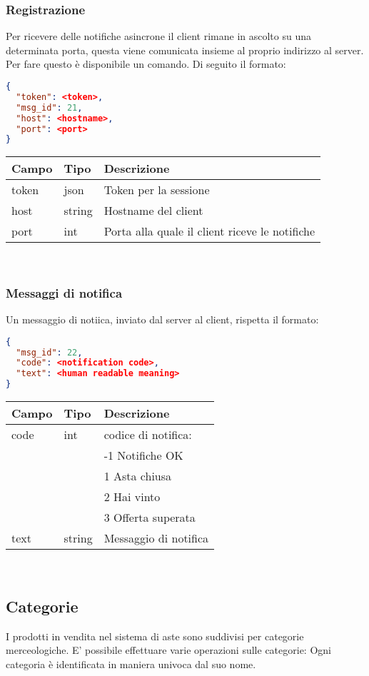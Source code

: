 \subsubsection{Registrazione}
Per ricevere delle notifiche asincrone il client  rimane in ascolto su una determinata porta, questa viene  comunicata insieme al proprio indirizzo  al server. Per fare questo è disponibile un comando. Di seguito il formato:\\
\begin{lstlisting}[language=json]
{
  "token": <token>,
  "msg_id": 21,
  "host": <hostname>,
  "port": <port>
}
\end{lstlisting}

\begin{tabular}{|l | l | l |}
\hline
Campo & Tipo & Descrizione \\ \hline
token & json & Token per la sessione \\ \hline
host & string & Hostname del client  \\ \hline
port & int & Porta alla quale il client riceve le notifiche  \\ \hline
\end{tabular} \\
\subsubsection{Messaggi di notifica}
Un messaggio di notiica, inviato dal server al client, rispetta il formato:
\begin{lstlisting}[language=json]
{
  "msg_id": 22,
  "code": <notification code>,
  "text": <human readable meaning>
}
\end{lstlisting}
\begin{tabular}{|l | l | l |}
\hline
Campo & Tipo & Descrizione \\ \hline
code & int & codice di notifica: \\
& & -1 Notifiche OK \\
& & 1 Asta chiusa\\
& & 2 Hai vinto\\
& & 3 Offerta superata\\ \hline

text & string & Messaggio di notifica \\ \hline
\end{tabular} \\


\subsection{Categorie}
I prodotti in vendita nel sistema di aste sono suddivisi per categorie merceologiche. E' possibile effettuare varie operazioni sulle categorie:
Ogni categoria è identificata in maniera univoca dal suo nome.
